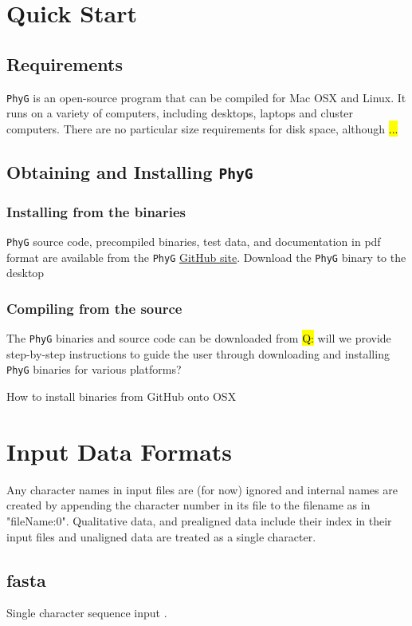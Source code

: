 \documentclass[11pt]{book}
\newcommand{\phyg}{\texttt{PhyG} }
\begin{document}
{{	\section{Quick Start}
		\subsection{Requirements}
		\phyg is an open-source program that can be compiled for Mac OSX and Linux. It 
		runs on a variety of computers, including desktops, laptops and cluster computers.
		There are no particular size requirements for disk space, although \hl{...}
		
		\subsection{Obtaining and Installing \phyg}
		\subsubsection{Installing from the binaries}
		\phyg source code, precompiled binaries, test data, and documentation in pdf format 
		are available from the \phyg \href{https://github.com/amnh/PhyGraph}{GitHub site}.
		Download the \phyg binary to the desktop
		
		\subsubsection{Compiling from the source}
		The \phyg binaries and source code can be downloaded from 
		\hl{Q: } will we provide step-by-step instructions to guide the user through downloading 
		and installing 
		\phyg binaries for various platforms?
		
		How to install binaries from GitHub onto OSX
	
\section{Input Data Formats}
	Any character names in input files are (for now) ignored and internal names are created
	by appending the character number in its file to the filename as in "fileName:0".
	Qualitative data, and prealigned data include their index in their input files and unaligned 
	data are treated as a single character.
	
	\subsection{fasta}
		Single character sequence input \citep{PearsonandLipman1988}.
		
}}
\end{document}
